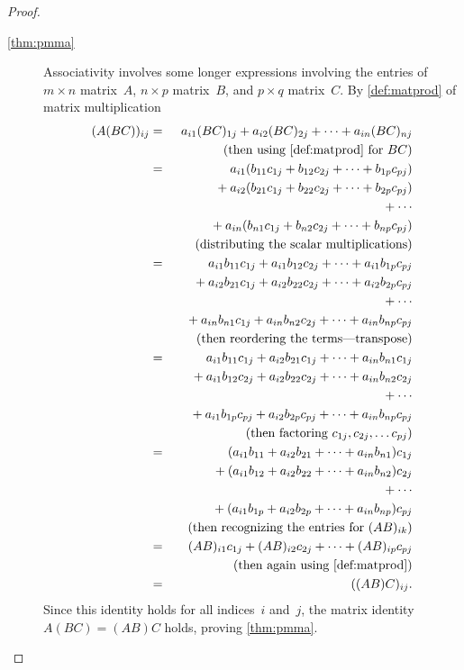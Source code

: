 \begin{proof}
\begin{description}
\item[\ref{thm:pmma}] Associativity involves some longer expressions involving the entries of \(m\times n\) matrix~\(A\), \(n\times p\) matrix~\(B\), and \(p\times q\) matrix~\(C\). 
By \cref{def:matprod} of matrix multiplication
\begin{eqnarray*}
(A(BC))_{ij}&=& a_{i1}(BC)_{1j}+a_{i2}(BC)_{2j}+\cdots+a_{in}(BC)_{nj}
\\&&\quad(\text{then using  \cref{def:matprod} for }BC)
\\&=&\phantom{{}+{}}a_{i1}(b_{11}c_{1j}+b_{12}c_{2j}+\cdots+b_{1p}c_{pj})
\\&&{}+a_{i2}(b_{21}c_{1j}+b_{22}c_{2j}+\cdots+b_{2p}c_{pj})
\\&&{}+\cdots
\\&&{}+a_{in}(b_{n1}c_{1j}+b_{n2}c_{2j}+\cdots+b_{np}c_{pj})
\\&&{}\quad(\text{distributing the scalar multiplications})
\\&=&\phantom{{}+{}}a_{i1}b_{11}c_{1j}+a_{i1}b_{12}c_{2j}+\cdots+a_{i1}b_{1p}c_{pj}
\\&&{}+a_{i2}b_{21}c_{1j}+a_{i2}b_{22}c_{2j}+\cdots+a_{i2}b_{2p}c_{pj}
\\&&{}+\cdots
\\&&{}+a_{in}b_{n1}c_{1j}+a_{in}b_{n2}c_{2j}+\cdots+a_{in}b_{np}c_{pj}
\\&&{}\quad(\text{then reordering the terms---transpose})
\\&=&\phantom{{}+{}}a_{i1}b_{11}c_{1j}+a_{i2}b_{21}c_{1j}+\cdots+a_{in}b_{n1}c_{1j}
\\&&{}+a_{i1}b_{12}c_{2j}+a_{i2}b_{22}c_{2j}+\cdots+a_{in}b_{n2}c_{2j}
\\&&{}+\cdots
\\&&{}+a_{i1}b_{1p}c_{pj}+a_{i2}b_{2p}c_{pj}+\cdots+a_{in}b_{np}c_{pj}
\\&&{}\quad(\text{then factoring }c_{1j},c_{2j},\ldots c_{pj})
\\&=&\phantom{{}+{}}(a_{i1}b_{11}+a_{i2}b_{21}+\cdots+a_{in}b_{n1})c_{1j}
\\&&{}+(a_{i1}b_{12}+a_{i2}b_{22}+\cdots+a_{in}b_{n2})c_{2j}
\\&&{}+\cdots
\\&&{}+(a_{i1}b_{1p}+a_{i2}b_{2p}+\cdots+a_{in}b_{np})c_{pj}
\\&&{}\quad(\text{then recognizing the entries for }(AB)_{ik})
\\&=&(AB)_{i1}c_{1j} +(AB)_{i2}c_{2j} +\cdots +(AB)_{ip}c_{pj}
\\&&{}\quad(\text{then again using  \cref{def:matprod}})
\\&=&((AB)C)_{ij}.
\end{eqnarray*}
Since this identity holds for all indices~\(i\) and~\(j\), the matrix identity \(A(BC)=(AB)C\) holds, proving \cref{thm:pmma}.


\end{description}
\end{proof}
